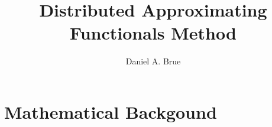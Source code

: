 \documentclass[letterpaper]{article}
\begin{document}
\title{Distributed Approximating Functionals Method}
\author{Daniel A. Brue}
\maketitle
\section{Mathematical Backgound}
\end{document}
